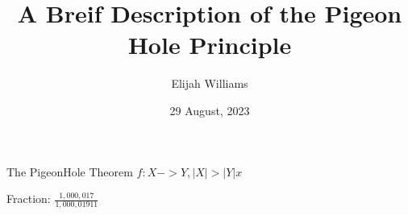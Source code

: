 \documentclass{article}
\title{A Breif Description of the Pigeon Hole Principle}
\author{Elijah Williams}
\date{29 August, 2023}
\begin{document}
\maketitle
\newpage

The PigeonHole Theorem
$ f:X->Y, |X| > |Y|    x $


Fraction: \( \frac{1,000,017}{1,000,01911} \)
\end{document}
